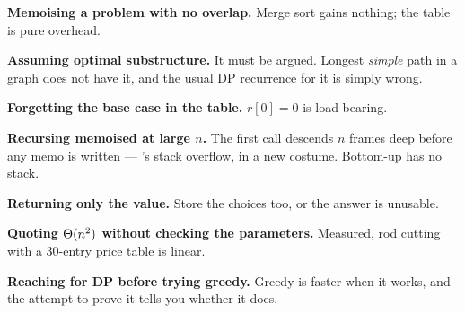 \begin{pitfall}
\begin{tight}
  \item \textbf{Memoising a problem with no overlap.} Merge sort gains nothing;
        the table is pure overhead.
  \item \textbf{Assuming optimal substructure.} It must be argued. Longest
        \emph{simple} path in a graph does not have it, and the usual DP
        recurrence for it is simply wrong.
  \item \textbf{Forgetting the base case in the table.} $r[0] = 0$ is load
        bearing.
  \item \textbf{Recursing memoised at large $n$.} The first call descends $n$
        frames deep before any memo is written --- 's stack
        overflow, in a new costume. Bottom-up has no stack.
  \item \textbf{Returning only the value.} Store the choices too, or the
        answer is unusable.
  \item \textbf{Quoting $\Theta(n^{2})$ without checking the parameters.}
        Measured, rod cutting with a 30-entry price table is linear.
  \item \textbf{Reaching for DP before trying greedy.} Greedy is faster when it
        works, and the attempt to prove it tells you whether it does.
\end{tight}
\end{pitfall}

